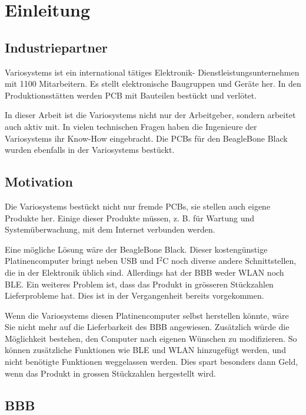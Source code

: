 \chapter{Einleitung}


\section{Industriepartner}
Variosystems ist ein international tätiges Elektronik- Dienstleistungsunternehmen mit 1100 Mitarbeitern. Es stellt elektronische Baugruppen und Geräte her. In den Produktionsstätten werden PCB mit Bauteilen bestückt und verlötet. \cite{variosystems} 

In dieser Arbeit ist die Variosystems nicht nur der Arbeitgeber, sondern arbeitet auch aktiv mit. In vielen technischen Fragen haben die Ingenieure der Variosystems ihr Know-How eingebracht. Die PCBs für den BeagleBone Black wurden ebenfalls in der Variosystems bestückt.



\section{Motivation}
Die Variosystems bestückt nicht nur fremde PCBs, sie stellen auch eigene Produkte her. Einige dieser Produkte müssen, z. B. für Wartung und Systemüberwachung, mit dem Internet verbunden werden.

Eine mögliche Lösung wäre der BeagleBone Black. Dieser kostengünstige Platinencomputer bringt neben USB und I$^2$C noch diverse andere Schnittstellen, die in der Elektronik üblich sind. Allerdings hat der BBB weder WLAN noch BLE. Ein weiteres Problem ist, dass das Produkt in grösseren Stückzahlen Lieferprobleme hat. Dies ist in der Vergangenheit bereits vorgekommen.

Wenn die Variosystems diesen Platinencomputer selbst herstellen könnte, wäre Sie nicht mehr auf die Lieferbarkeit des BBB angewiesen. Zusätzlich würde die Möglichkeit bestehen, den Computer nach eigenen Wünschen zu modifizieren. So können zusätzliche Funktionen wie BLE und WLAN hinzugefügt werden, und nicht benötigte Funktionen weggelassen werden. Dies spart besonders dann Geld, wenn das Produkt in grossen Stückzahlen hergestellt wird.


\section{BBB}

